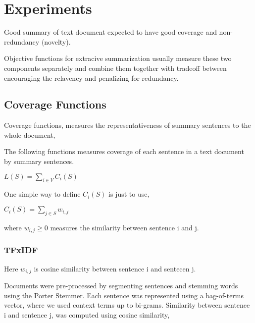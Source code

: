 \chapter{Experiments}

Good summary of text document expected to have good coverage and non-redundancy (novelty).

Objective functions for extracive summarization usually measure these two components separately and combine them together with tradeoff between encouraging the relavency and penalizing for redundancy.\\



\section{Coverage Functions}

Coverage functions, measures the representativeness of summary sentences to the whole document,

The following functions measures coverage of each sentence in a text document by summary sentences.

$L(S) = \sum_{i \in V} C_i(S)$

One simple way to define $C_i(S)$
is just to use,

$C_i(S) = \sum_{j \in S} w_{i,j}$

where $w_{i,j} \geq 0$ measures the similarity between sentence i and j.


\subsection{TFxIDF}

Here $w_{i,j}$ is cosine similarity between sentence i and sentecen j.

Documents were pre-processed by segmenting sentences and stemming words using the Porter Stemmer. Each sentence was represented using a bag-of-terms vector, where we used context terms up to bi-grams. Similarity between sentence i and sentence j, was computed using cosine similarity,\\

